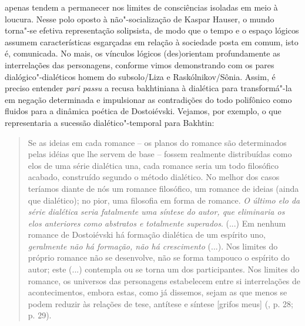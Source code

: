 {{apenas tendem a permanecer nos limites de consciências isoladas em meio
à loucura. Nesse polo oposto à não"-socialização de Kaspar Hauser, o
mundo torna"-se efetiva representação solipsista, de modo que o tempo e o
espaço lógicos assumem características esgarçadas em relação à sociedade
posta em comum, isto é, comunicada. No mais, os vínculos lógicos
(des)orientam profundamente as interrelações das personagens, conforme
vimos demonstrando com os pares dialógico"-dialéticos homem do
subsolo/Liza e Raskólnikov/Sônia. Assim, é preciso entender \emph{pari
passu} a recusa bakhtiniana à dialética para transformá"-la em negação
determinada e impulsionar as contradições do todo polifônico como
fluidos para a dinâmica poética de Dostoiévski. Vejamos, por exemplo, o
que representaria a sucessão dialético"-temporal para Bakhtin:

\begin{quote}
Se as ideias em cada romance -- os planos do romance são determinados
pelas idéias que lhe servem de base -- fossem realmente distribuídas
como elos de uma série dialética una, cada romance seria um todo
filosófico acabado, construído segundo o método dialético. No melhor dos
casos teríamos diante de nós um romance filosófico, um romance de ideias
(ainda que dialético); no pior, uma filosofia em forma de romance.
\emph{O último elo da série dialética seria fatalmente uma síntese do
autor, que eliminaria os elos anteriores como abstratos e totalmente
superados}. (...) Em nenhum romance de Dostoiévski há formação dialética
de um espírito uno, \emph{geralmente não há formação, não há
crescimento} (...). Nos limites do próprio romance não se desenvolve,
não se forma tampouco o espírito do autor; este (...) contempla ou se
torna um dos participantes. Nos limites do romance, os universos das
personagens estabelecem entre si interrelações de acontecimentos, embora
estas, como já dissemos, sejam as que menos se podem reduzir às relações
de tese, antítese e síntese {[}grifos meus{]} (, p. 28; p. 29).
\end{quote}

}}
